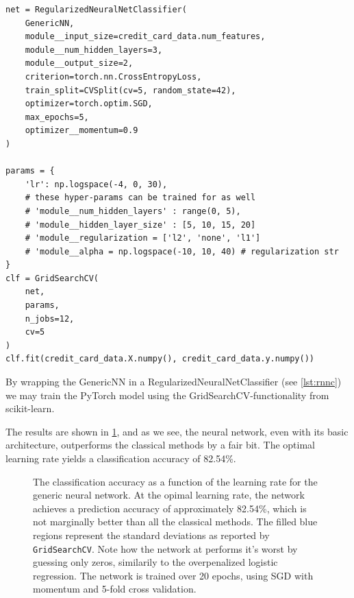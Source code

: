 \documentclass[a4paper, 11pt, oneside, article]{memoir}
\begin{document}
	\begin{listing}
	\begin{verbatim}
net = RegularizedNeuralNetClassifier(
    GenericNN,
    module__input_size=credit_card_data.num_features,
    module__num_hidden_layers=3,
    module__output_size=2,
    criterion=torch.nn.CrossEntropyLoss,
    train_split=CVSplit(cv=5, random_state=42),
    optimizer=torch.optim.SGD,
    max_epochs=5,
    optimizer__momentum=0.9
)

params = {
    'lr': np.logspace(-4, 0, 30),
    # these hyper-params can be trained for as well
    # 'module__num_hidden_layers' : range(0, 5),
    # 'module__hidden_layer_size' : [5, 10, 15, 20]
    # 'module__regularization = ['l2', 'none', 'l1'] 
    # 'module__alpha = np.logspace(-10, 10, 40) # regularization str
}
clf = GridSearchCV(
    net,
    params,
    n_jobs=12,
    cv=5
)
clf.fit(credit_card_data.X.numpy(), credit_card_data.y.numpy())
	\end{verbatim}
	\caption{By wrapping the GenericNN in a RegularizedNeuralNetClassifier
	(see \cref{lst:rnnc}) we may train the PyTorch model using the
GridSearchCV-functionality from scikit-learn.}
	\label{lst:classification_nn}
	\end{listing}

	The results are shown in \cref{fig:credit_card_nn}, and as we see, the
	neural network, even with its basic architecture, outperforms the
	classical methods by a fair bit. The optimal learning rate yields a
	classification accuracy of 82.54\%.
	
	\begin{figure}[htpb]
		\centering
			
		\caption{The classification accuracy as a function of the
			learning rate for the generic neural network. At the
			opimal learning rate, the network achieves a prediction
			accuracy of approximately 82.54\%, which is not
			marginally better than all the classical methods.
			The filled blue regions represent the standard
			deviations as reported by \texttt{GridSearchCV}. Note
			how the network at performs it's worst by guessing only
			zeros, similarily to the overpenalized logistic
		regression. The network is trained over 20 epochs, using SGD
	with momentum and 5-fold cross validation. }%
		\label{fig:credit_card_nn}
	\end{figure}
\end{document}
